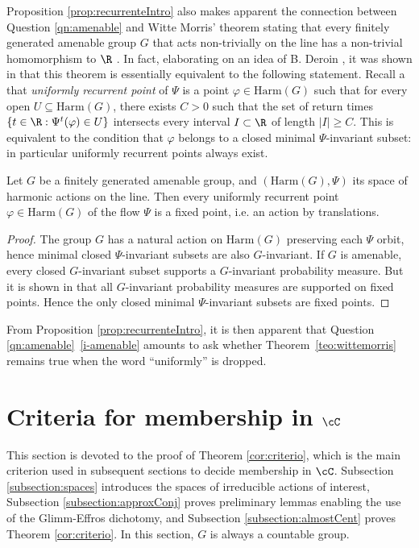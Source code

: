 \documentclass[reqno]{amsart}
\begin{document}
Proposition \ref{prop:recurrenteIntro} also makes apparent the connection between Question \ref{qn:amenable} and Witte Morris' theorem stating that every finitely generated amenable group $G$ that acts non-trivially on the line has a non-trivial homomorphism to $\R$ \cite{WitteMorris2006}. In fact, elaborating on an idea of B. Deroin \cite{deroinAlmost}, it was shown in \cite[Remark 3.11]{BMRTrealisation} that  this theorem is essentially equivalent to the following statement. Recall a that \emph{uniformly recurrent point} of $\Psi$ is a point $\varphi \in \mathrm{Harm}(G)$ such that for every open $U \subseteq \mathrm{Harm}(G)$, there exists $C>0$ such that the set of return times $\{t \in \R : \Psi^t(\varphi) \in U\}$ intersects every interval $I\subset \R$ of length $|I|\ge C$. This is equivalent to the condition that $\varphi$ belongs to a closed minimal $\Psi$-invariant subset: in particular uniformly recurrent points always exist. 
\begin{teo}\label{teo:wittemorris}
Let $G$ be a finitely generated amenable group, and $(\mathrm{Harm}(G), \Psi)$ its space of harmonic actions on the line. Then every uniformly recurrent point $\varphi\in\mathrm{Harm}(G)$ of the flow $\Psi$ is a fixed point, i.e. an action by translations.
\end{teo}
\begin{proof}
The group $G$ has a natural action on $\mathrm{Harm}(G)$ preserving each $\Psi$ orbit, hence minimal closed $\Psi$-invariant subsets are also $G$-invariant. If $G$ is amenable, every closed $G$-invariant subset supports a $G$-invariant probability measure. But it is shown in \cite[Proposition 3.10]{BMRTrealisation} that all $G$-invariant probability measures are supported on fixed points. Hence the only closed minimal $\Psi$-invariant subsets are fixed points.
\end{proof}
 From Proposition \ref{prop:recurrenteIntro}, it is then apparent that Question \ref{qn:amenable}~\eqref{i-amenable} amounts to ask whether Theorem~\ref{teo:wittemorris} remains true when the word ``uniformly'' is dropped.


\section{Criteria for membership in $\cC$} \label{section:spaces}
This section is devoted to the proof of Theorem \ref{cor:criterio}, which is the main criterion used in subsequent sections to decide membership in $\cC$. Subsection \ref{subsection:spaces} introduces the spaces of irreducible actions of interest, Subsection \ref{subsection:approxConj} proves preliminary lemmas enabling the use of the Glimm-Effros dichotomy, and Subsection \ref{subsection:almostCent} proves Theorem \ref{cor:criterio}. In this section, $G$ is always a countable group.
\end{document}
